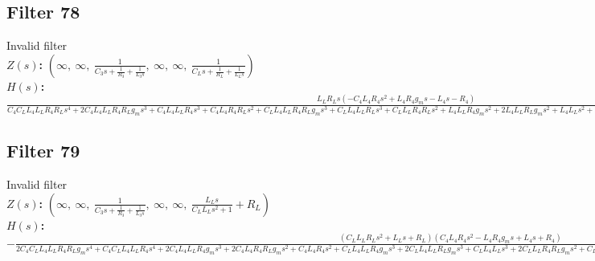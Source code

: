 \documentclass{article}
\begin{document}
\subsection*{Filter 78}
Invalid filter \\ 
\textbf{$Z(s)$:} $\left( \infty, \  \infty, \  \frac{1}{C_{3} s + \frac{1}{R_{3}} + \frac{1}{L_{3} s}}, \  \infty, \  \infty, \  \frac{1}{C_{L} s + \frac{1}{R_{L}} + \frac{1}{L_{L} s}}\right)$ \\ 
\textbf{$H(s)$:} $\frac{L_{L} R_{L} s \left(- C_{4} L_{4} R_{4} s^{2} + L_{4} R_{4} g_{m} s - L_{4} s - R_{4}\right)}{C_{4} C_{L} L_{4} L_{L} R_{4} R_{L} s^{4} + 2 C_{4} L_{4} L_{L} R_{4} R_{L} g_{m} s^{3} + C_{4} L_{4} L_{L} R_{4} s^{3} + C_{4} L_{4} R_{4} R_{L} s^{2} + C_{L} L_{4} L_{L} R_{4} R_{L} g_{m} s^{3} + C_{L} L_{4} L_{L} R_{L} s^{3} + C_{L} L_{L} R_{4} R_{L} s^{2} + L_{4} L_{L} R_{4} g_{m} s^{2} + 2 L_{4} L_{L} R_{L} g_{m} s^{2} + L_{4} L_{L} s^{2} + L_{4} R_{4} R_{L} g_{m} s + L_{4} R_{L} s + 2 L_{L} R_{4} R_{L} g_{m} s + L_{L} R_{4} s + R_{4} R_{L}}$ \\ 
\subsection*{Filter 79}
Invalid filter \\ 
\textbf{$Z(s)$:} $\left( \infty, \  \infty, \  \frac{1}{C_{3} s + \frac{1}{R_{3}} + \frac{1}{L_{3} s}}, \  \infty, \  \infty, \  \frac{L_{L} s}{C_{L} L_{L} s^{2} + 1} + R_{L}\right)$ \\ 
\textbf{$H(s)$:} $- \frac{\left(C_{L} L_{L} R_{L} s^{2} + L_{L} s + R_{L}\right) \left(C_{4} L_{4} R_{4} s^{2} - L_{4} R_{4} g_{m} s + L_{4} s + R_{4}\right)}{2 C_{4} C_{L} L_{4} L_{L} R_{4} R_{L} g_{m} s^{4} + C_{4} C_{L} L_{4} L_{L} R_{4} s^{4} + 2 C_{4} L_{4} L_{L} R_{4} g_{m} s^{3} + 2 C_{4} L_{4} R_{4} R_{L} g_{m} s^{2} + C_{4} L_{4} R_{4} s^{2} + C_{L} L_{4} L_{L} R_{4} g_{m} s^{3} + 2 C_{L} L_{4} L_{L} R_{L} g_{m} s^{3} + C_{L} L_{4} L_{L} s^{3} + 2 C_{L} L_{L} R_{4} R_{L} g_{m} s^{2} + C_{L} L_{L} R_{4} s^{2} + 2 L_{4} L_{L} g_{m} s^{2} + L_{4} R_{4} g_{m} s + 2 L_{4} R_{L} g_{m} s + L_{4} s + 2 L_{L} R_{4} g_{m} s + 2 R_{4} R_{L} g_{m} + R_{4}}$ \\ 
\end{document}
